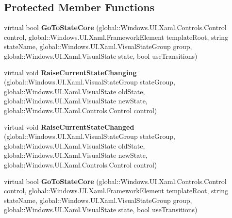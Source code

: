 \subsection*{Protected Member Functions}
\begin{DoxyCompactItemize}
\item 
\mbox{\label{class_windows_1_1_u_i_1_1_xaml_1_1_visual_state_manager_a8c0de7e6b9bdb57e46befcf69225644e}} 
virtual bool {\bfseries Go\+To\+State\+Core} (global\+::\+Windows.\+U\+I.\+Xaml.\+Controls.\+Control control, global\+::\+Windows.\+U\+I.\+Xaml.\+Framework\+Element template\+Root, string state\+Name, global\+::\+Windows.\+U\+I.\+Xaml.\+Visual\+State\+Group group, global\+::\+Windows.\+U\+I.\+Xaml.\+Visual\+State state, bool use\+Transitions)
\item 
\mbox{\label{class_windows_1_1_u_i_1_1_xaml_1_1_visual_state_manager_a50a0e31984a4bf6d06bb7e56db64a21f}} 
virtual void {\bfseries Raise\+Current\+State\+Changing} (global\+::\+Windows.\+U\+I.\+Xaml.\+Visual\+State\+Group state\+Group, global\+::\+Windows.\+U\+I.\+Xaml.\+Visual\+State old\+State, global\+::\+Windows.\+U\+I.\+Xaml.\+Visual\+State new\+State, global\+::\+Windows.\+U\+I.\+Xaml.\+Controls.\+Control control)
\item 
\mbox{\label{class_windows_1_1_u_i_1_1_xaml_1_1_visual_state_manager_a64847abd05cfc83d3fd14ec421fe7261}} 
virtual void {\bfseries Raise\+Current\+State\+Changed} (global\+::\+Windows.\+U\+I.\+Xaml.\+Visual\+State\+Group state\+Group, global\+::\+Windows.\+U\+I.\+Xaml.\+Visual\+State old\+State, global\+::\+Windows.\+U\+I.\+Xaml.\+Visual\+State new\+State, global\+::\+Windows.\+U\+I.\+Xaml.\+Controls.\+Control control)
\item 
\mbox{\label{class_windows_1_1_u_i_1_1_xaml_1_1_visual_state_manager_a8c0de7e6b9bdb57e46befcf69225644e}} 
virtual bool {\bfseries Go\+To\+State\+Core} (global\+::\+Windows.\+U\+I.\+Xaml.\+Controls.\+Control control, global\+::\+Windows.\+U\+I.\+Xaml.\+Framework\+Element template\+Root, string state\+Name, global\+::\+Windows.\+U\+I.\+Xaml.\+Visual\+State\+Group group, global\+::\+Windows.\+U\+I.\+Xaml.\+Visual\+State state, bool use\+Transitions)

\end{DoxyCompactItemize}
